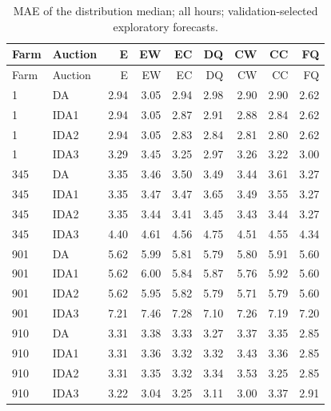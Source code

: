\documentclass[11pt,a4paper]{article}
\begin{document}
\begin{longtable}{llrrrrrrr}
\caption{MAE of the distribution median; all hours; validation-selected exploratory forecasts.}\\
\toprule Farm & Auction & E & EW & EC & DQ & CW & CC & FQ \\
\midrule\endfirsthead
\toprule Farm & Auction & E & EW & EC & DQ & CW & CC & FQ \\
\midrule\endhead
1 & DA & 2.94 & 3.05 & 2.94 & 2.98 & 2.90 & 2.90 & 2.62 \\
1 & IDA1 & 2.94 & 3.05 & 2.87 & 2.91 & 2.88 & 2.84 & 2.62 \\
1 & IDA2 & 2.94 & 3.05 & 2.83 & 2.84 & 2.81 & 2.80 & 2.62 \\
1 & IDA3 & 3.29 & 3.45 & 3.25 & 2.97 & 3.26 & 3.22 & 3.00 \\
\midrule
345 & DA & 3.35 & 3.46 & 3.50 & 3.49 & 3.44 & 3.61 & 3.27 \\
345 & IDA1 & 3.35 & 3.47 & 3.47 & 3.65 & 3.49 & 3.55 & 3.27 \\
345 & IDA2 & 3.35 & 3.44 & 3.41 & 3.45 & 3.43 & 3.44 & 3.27 \\
345 & IDA3 & 4.40 & 4.61 & 4.56 & 4.75 & 4.51 & 4.55 & 4.34 \\
\midrule
901 & DA & 5.62 & 5.99 & 5.81 & 5.79 & 5.80 & 5.91 & 5.60 \\
901 & IDA1 & 5.62 & 6.00 & 5.84 & 5.87 & 5.76 & 5.92 & 5.60 \\
901 & IDA2 & 5.62 & 5.95 & 5.82 & 5.79 & 5.71 & 5.79 & 5.60 \\
901 & IDA3 & 7.21 & 7.46 & 7.28 & 7.10 & 7.26 & 7.19 & 7.20 \\
\midrule
910 & DA & 3.31 & 3.38 & 3.33 & 3.27 & 3.37 & 3.35 & 2.85 \\
910 & IDA1 & 3.31 & 3.36 & 3.32 & 3.32 & 3.43 & 3.36 & 2.85 \\
910 & IDA2 & 3.31 & 3.35 & 3.32 & 3.34 & 3.53 & 3.25 & 2.85 \\
910 & IDA3 & 3.22 & 3.04 & 3.25 & 3.11 & 3.00 & 3.37 & 2.91 \\
\midrule
\bottomrule\end{longtable}
\normalsize
\small
\end{document}
